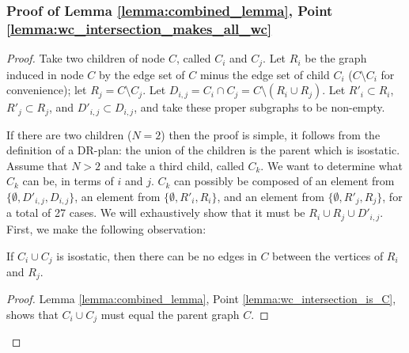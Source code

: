 \subsubsection{Proof of Lemma \ref{lemma:combined_lemma}, Point \ref{lemma:wc_intersection_makes_all_wc}}

\begin{proof}
    Take two children of node $C$, called $C_i$ and $C_j$. Let $R_i$ be the graph induced in node $C$ by the edge set of $C$ minus the edge set of child $C_i$ ($C\setminus C_i$ for convenience); let $R_j=C\setminus C_j$. Let $D_{i,j}=C_i\cap C_j=C\setminus (R_i\cup R_j)$. Let $R'_i\subset R_i$, $R'_j\subset R_j$, and $D'_{i,j}\subset D_{i,j}$, and take these proper subgraphs to be non-empty.

    If there are two children ($N=2$) then the proof is simple, it follows from the definition of a DR-plan: the union of the children is the parent which is isostatic. Assume that $N>2$ and take a third child, called $C_k$.
    We want to determine what $C_k$ can be, in terms of $i$ and $j$. $C_k$ can possibly be composed of an element from $\{\emptyset, D'_{i,j}, D_{i,j}\}$, an element from $\{\emptyset, R'_i, R_i\}$, and an element from $\{\emptyset, R'_j, R_j\}$, for a total of 27 cases. We will exhaustively show that it must be $R_i\cup R_j\cup D'_{i,j}$. First, we make the following observation:

    \begin{observation}\label{observation:no_edges_between_diff}
        If $C_i\cup C_j$ is isostatic, then there can be no edges in $C$ between the vertices of $R_i$ and $R_j$.
    \end{observation}

    \begin{proof}
        Lemma \ref{lemma:combined_lemma}, Point \ref{lemma:wc_intersection_is_C}, shows that $C_i\cup C_j$ must equal the parent graph $C$.
    \end{proof}







\end{proof}
